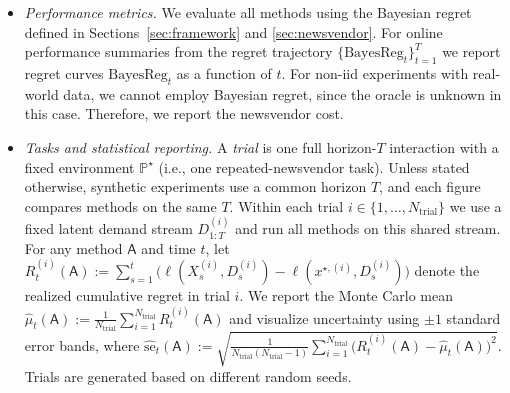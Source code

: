\documentclass[11pt]{article}
\renewcommand{\P}{\mathbb{P}}
\providecommand{\BReg}{\mathrm{BayesReg}}
\begin{document}
\begin{itemize}[leftmargin=*]
\item
\emph{Performance metrics.}
\label{subsubsec:exp-metrics}
We evaluate all methods using the Bayesian regret defined in Sections~\ref{sec:framework} and \ref{sec:newsvendor}.
For online performance summaries from the regret trajectory $\{\BReg_t\}_{t=1}^T$ we report regret curves $\BReg_t$ as a function of $t$. For non-iid experiments with real-world data, we cannot employ Bayesian regret, since the oracle is unknown in this case. Therefore, we report the newsvendor cost.




\item
\emph{Tasks and statistical reporting.}
A \emph{trial} is one full horizon-$T$ interaction with a fixed environment $\P^\star$ (i.e., one repeated-newsvendor task). Unless stated otherwise, synthetic experiments use a common horizon $T$, and each figure compares methods on the same $T$. 
Within each trial $i\in\{1,\dots,N_{\mathrm{trial}}\}$ we use a fixed latent demand stream $D_{1:T}^{(i)}$ and run all methods on this shared stream.
For any method $\mathsf{A}$ and time $t$, let
\(
R_t^{(i)}(\mathsf{A})
:= \sum_{s=1}^t \Big(\ell(X_s^{(i)},D_s^{(i)})-\ell(x^{\star,(i)},D_s^{(i)})\Big)
\)
denote the realized cumulative regret in trial $i$.
We report the Monte Carlo mean
\(\widehat{\mu}_t(\mathsf{A}) := \frac{1}{N_{\mathrm{trial}}}\sum_{i=1}^{N_{\mathrm{trial}}} R_t^{(i)}(\mathsf{A})\) and visualize uncertainty using $\pm 1$ standard error bands, where
\(
\widehat{\mathrm{se}}_t(\mathsf{A})
:= \sqrt{\frac{1}{N_{\mathrm{trial}}(N_{\mathrm{trial}}-1)}
\sum_{i=1}^{N_{\mathrm{trial}}}\Big(R_t^{(i)}(\mathsf{A})-\widehat{\mu}_t(\mathsf{A})\Big)^2 }.
\) 
Trials are generated based on different random seeds.


\end{itemize}
\end{document}
